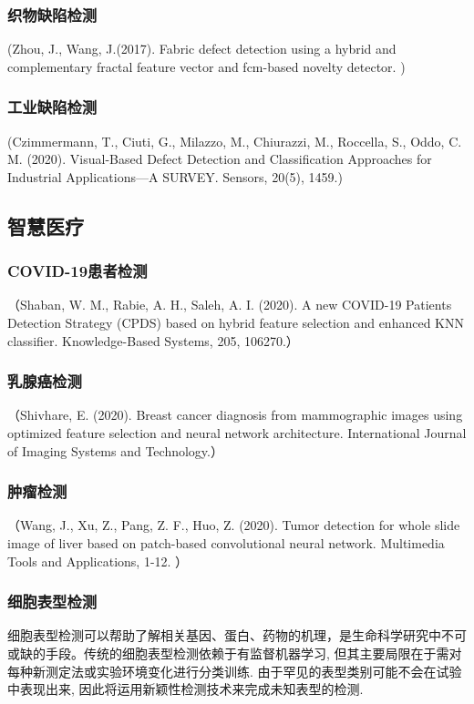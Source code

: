 \documentclass{Style/aas}
\begin{document}
\begin{multicols}{2}
  \subsubsection{织物缺陷检测}
  (Zhou, J., Wang, J.(2017). Fabric defect detection using a hybrid and complementary fractal feature vector and fcm-based novelty detector. )

  \subsubsection{工业缺陷检测}
  (Czimmermann, T., Ciuti, G., Milazzo, M., Chiurazzi, M., Roccella, S., Oddo, C. M. (2020). Visual-Based Defect Detection and Classification Approaches for Industrial Applications—A SURVEY. Sensors, 20(5), 1459.)

  \subsection{智慧医疗}
  \subsubsection{COVID-19患者检测}
  （Shaban, W. M., Rabie, A. H., Saleh, A. I. (2020). A new COVID-19 Patients Detection Strategy (CPDS) based on hybrid feature selection and enhanced KNN classifier. Knowledge-Based Systems, 205, 106270.）

  \subsubsection{乳腺癌检测}
  （Shivhare, E. (2020). Breast cancer diagnosis from mammographic images using optimized feature selection and neural network architecture. International Journal of Imaging Systems and Technology.）

  \subsubsection{肿瘤检测}
  （Wang, J., Xu, Z., Pang, Z. F., Huo, Z. (2020). Tumor detection for whole slide image of liver based on patch-based convolutional neural network. Multimedia Tools and Applications, 1-12. ）

  \subsubsection{细胞表型检测}
  细胞表型检测可以帮助了解相关基因、蛋白、药物的机理，是生命科学研究中不可或缺的手段。传统的细胞表型检测依赖于有监督机器学习, 但其主要局限在于需对每种新测定法或实验环境变化进行分类训练. 由于罕见的表型类别可能不会在试验中表现出来, 因此将运用新颖性检测技术来完成未知表型的检测.


\end{multicols}
\end{document}
